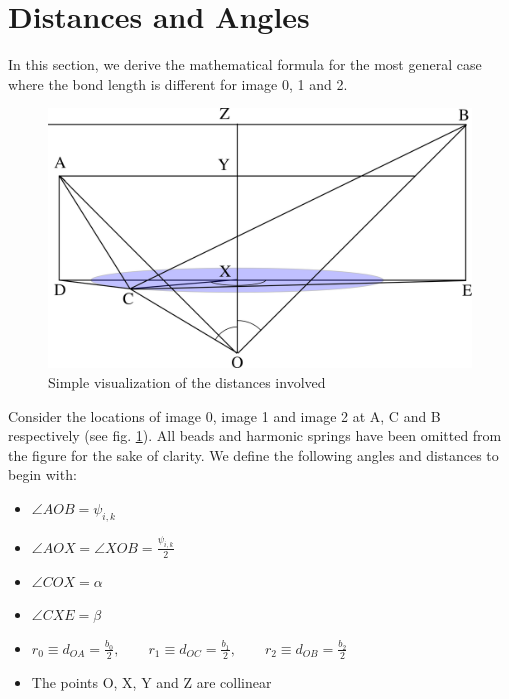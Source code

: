 \label{Appendix A}
    \section{Distances and Angles}
        In this section, we derive the mathematical formula for the most general case where the bond length is different for image 0, 1 and 2.
        \begin{figure}[!htbp]
            \centering
            \includegraphics[scale=1.5,keepaspectratio]{Appendix-A/Figures/differentBondlength.png}
            \caption{Simple visualization of the distances involved}
            \label{fig:dist}
        \end{figure}
        Consider the locations of image 0, image 1 and image 2 at A, C and B respectively (see fig. \ref{fig:dist}). All beads and harmonic springs have been omitted from the figure for the sake of clarity. We define the following angles and distances to begin with:
        \begin{itemize}
            \item $\angle AOB = \psi_{i,k}$
            \item $\angle AOX = \angle XOB = \displaystyle\frac{\psi_{i,k}}{2}$
            \item $\angle COX = \alpha$
            \item $\angle CXE = \beta$
            \item $r_0 \equiv d_{OA} = \displaystyle\frac{b_0}{2} , \qquad r_1 \equiv d_{OC} = \frac{b_1}{2}, \qquad r_2 \equiv d_{OB} = \frac{b_2}{2}$
            \item The points O, X, Y and Z are collinear
        \end{itemize}

